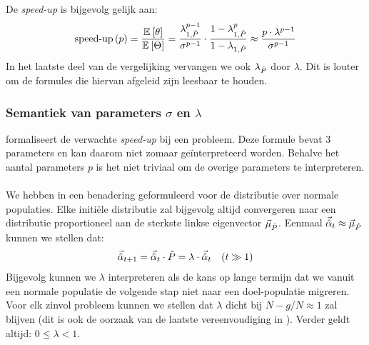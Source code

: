 De \emph{speed-up} is bijgevolg gelijk aan:
\begin{equation}
\funm{speed-up}{p}=\displaystyle\frac{\mean{\hittime}}{\mean{\phittime}}=\displaystyle\frac{\lambda_{1,\hat{P}}^{p-1}}{\sigma^{p-1}}\cdot\displaystyle\frac{1-\lambda_{1,\hat{P}}^{p}}{1-\lambda_{1,\hat{P}}}\approx\displaystyle\frac{p\cdot\lambda^{p-1}}{\sigma^{p-1}}
\eqnlab{speedupMetaheuristic}
\end{equation}
In het laatste deel van de vergelijking vervangen we ook $\ev[\hat{P}]$ door $\lambda$. Dit is louter om de formules die hiervan afgeleid zijn leesbaar te houden.

\subsubsection{Semantiek van parameters $\sigma$ en $\lambda$}

 formaliseert de verwachte \emph{speed-up} bij een probleem. Deze formule bevat 3 parameters en kan daarom niet zomaar ge\"interpreteerd worden. Behalve het aantal parameters $p$ is het niet triviaal om de overige parameters te interpreteren.

\paragraph{}
We hebben in  een benadering geformuleerd voor de distributie over normale populaties. Elke initi\"ele distributie zal bijgevolg altijd convergeren naar een distributie proportioneel aan de sterkste linkse eigenvector $\evl[\hat{P}]$. Eenmaal $\vec{\hat{\alpha}}_t\approx\evl[\hat{P}]$ kunnen we stellen dat:
\begin{equation}
\conditional{\vec{\hat{\alpha}}_{t+1}=\vec{\hat{\alpha}}_t\cdot\hat{P}=\lambda\cdot\vec{\hat{\alpha}}_{t}}{$t\gg 1$}
\end{equation}
Bijgevolg kunnen we $\lambda$ interpreteren als de kans op lange termijn dat we vanuit een normale populatie de volgende stap niet naar een doel-populatie migreren. Voor elk zinvol probleem kunnen we stellen dat $\lambda$ dicht bij $N-g/N\approx 1$ zal blijven (dit is ook de oorzaak van de laatste vereenvoudiging in ). Verder geldt altijd: $0\leq\lambda<1$.

\paragraph{}

